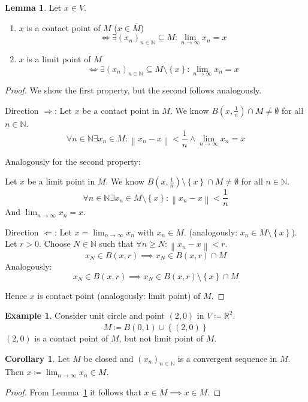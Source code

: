 \documentclass[a4paper,landscape,twocolumn]{article}
\theoremstyle{definition}
\newtheorem{ex}{Example}
\newtheorem{cor}{Corollary}
\newtheorem{lemma}{Lemma}
\newcommand\set[1]{\left\{#1\right\}}
\newcommand\norm[1]{\left\|#1\right\|}
\begin{document}
\begin{lemma}
  \label{lemma:con-lim}
  Let $x \in V$.
  \begin{enumerate}
    \item $x$ is a contact point of $M$ ($x \in \overline{M}$)
      \[ \iff \exists (x_n)_{n\in\mathbb N} \subseteq M: \lim_{n\to\infty} x_n = x \]
    \item $x$ is a limit point of $M$
      \[ \iff \exists (x_n)_{n\in\mathbb N} \subseteq M \setminus \set{x}: \lim_{n\to\infty} x_n = x \]
  \end{enumerate}
\end{lemma}
\begin{proof}
  We show the first property, but the second follows analogously.

  Direction $\Rightarrow$:
  Let $x$ be a contact point in $M$. We know $B\left(x, \frac1{n}\right) \cap M \neq \emptyset$ for all $n \in \mathbb N$.
  \[ \forall n \in \mathbb N \exists x_n \in M: \norm{x_n - x} < \frac{1}{n} \land \lim_{n\to\infty} x_n = x \]

  Analogously for the second property:

  Let $x$ be a limit point in $M$. We know $B\left(x, \frac1n\right) \setminus \set{x} \cap M \neq \emptyset$ for all $n \in \mathbb N$.
  \[ \forall n \in \mathbb N \exists x_n \in M \setminus \set{x}: \norm{x_n - x} < \frac{1}{n} \]
  And $\lim_{n\to\infty} x_n = x$.

  Direction $\Leftarrow$:
  Let $x = \lim_{n\to\infty} x_n$ with $x_n \in M$.
  (analogously: $x_n \in M \setminus \set{x}$).
  Let $r > 0$. Choose $N \in \mathbb N$ such that $\forall n \geq N: \norm{x_n - x} < r$.
  \[ x_N \in B(x,r) \implies x_N \in B(x, r) \cap M \]
  Analogously:
  \[ x_N \in B(x, r) \implies x_N \in B(x, r) \setminus \set{x} \cap M \]

  Hence $x$ is contact point (analogously: limit point) of $M$.
\end{proof}
\begin{ex}
  Consider unit circle and point $(2,0)$ in $V \coloneqq \mathbb R^2$.
  \[ M \coloneqq \overline{B(0,1)} \cup \set{(2,0)} \]
  $(2,0)$ is a contact point of $M$, but not limit point of $M$.
\end{ex}

\begin{cor}
  Let $M$ be closed and $(x_n)_{n\in\mathbb N}$ is a convergent sequence in $M$.
  Then $x \coloneqq \lim_{n\to\infty} x_n \in M$.
\end{cor}
\begin{proof}
  From Lemma~\ref{lemma:con-lim} it follows that $x \in \overline{M} \implies x \in M$.
\end{proof}
\end{document}
